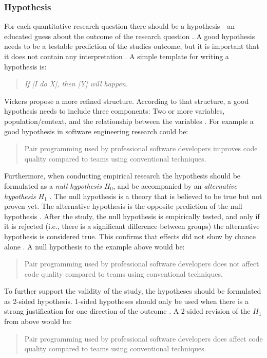 
\subsubsection{Hypothesis}

For each quantitative research question there should be a hypothesis - an educated guess about the outcome of the research question \cite{Buddies2010,Farrugia2009}. A good hypothesis needs to be a testable prediction of the studies outcome, but it is important that it does not contain any interpretation \cite{Prasad2001}. A simple template for writing a hypothesis is:
\begin{quote}
	 \emph{If [I do X], then [Y] will happen.} \cite{Buddies2010}
\end{quote}
Vickers \etal propose a more refined structure. According to that structure, a good hypothesis needs to include three components: Two or more variables, population/context, and the relationship between the variables \cite{Vickers}.  For example a good hypothesis in software engineering research could be: 
\begin{quote}
	Pair programming used by professional software developers improves code quality compared to teams using conventional techniques.
\end{quote}
Furthermore, when conducting empirical research the hypothesis should be formulated as a \emph{null hypothesis $H_0$}, and be accompanied by an \emph{alternative hypothesis $H_1$} \cite{Farrugia2009}. The null hypothesis is a theory that is believed to be true but not proven yet. The alternative hypothesis is the opposite prediction of the null hypothesis \cite{Prasad2001}. After the study, the null hypothesis is empirically tested, and only if it is rejected (i.e., there is a significant difference between groups) the alternative hypothesis is considered true. This confirms that effects did not show by chance alone \cite{Farrugia2009}. A null hypothesis to the example above would be:
\begin{quote}
	Pair programming used by professional software developers does not affect code quality compared to teams using conventional techniques.
\end{quote}
To further support the validity of the study, the hypotheses should be formulated as 2-sided hypothesis. \cite[p.280]{Farrugia2009} 1-sided hypotheses should only be used when there is a strong justification for one direction of the outcome \cite{Farrugia2009}. A 2-sided revision of the $H_1$ from above would be: 
\begin{quote}
	Pair programming used by professional software developers does affect code quality compared to teams using conventional techniques.
\end{quote}






